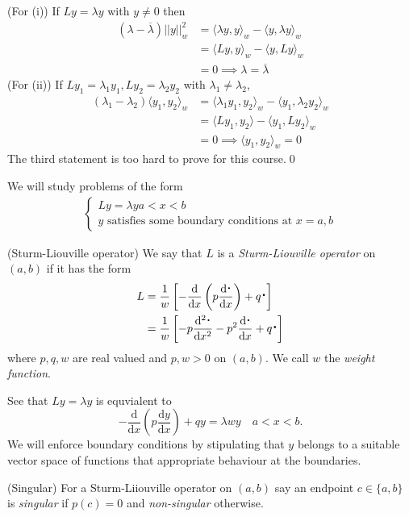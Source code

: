 \documentclass{article}
\begin{document}
	 \pf (For (i)) If $ Ly=\lambda y $ with $ y\ne 0 $ then
	 \begin{align*}
		 (\lambda-\overline\lambda)||y||_w^2&=\langle \lambda y,y\rangle_w-\langle y,\lambda y\rangle_w \\
						    &= \langle Ly, y\rangle_w - \langle y,Ly\rangle_w \\
						    &= 0 \implies \lambda = \overline \lambda
	 \end{align*}
	 (For (ii)) If $ Ly_1=\lambda_1y_1, Ly_2=\lambda_2y_2 $ with $ \lambda_1\ne \lambda_2 $,
	 \begin{align*}
		 (\lambda_1-\lambda_2)\langle y_1,y_2\rangle_w &= \langle \lambda_1y_1,y_2\rangle_w-\langle y_1,\lambda_2y_2\rangle _w\\
							       &= \langle Ly_1,y_2\rangle - \langle y_1,Ly_2\rangle_w \\
							       &= 0 \implies \langle y_1,y_2\rangle_w=0
	 \end{align*}
	 The third statement is too hard to prove for this course.\qed
\par
We will study problems of the form
\begin{align}
  \begin{cases}
	  Ly=\lambda y a<x<b \\
	  y \text{ satisfies some boundary conditions at } x=a,b
  \end{cases}
\end{align}
\begin{definition}
	(Sturm-Liouville operator) We say that $ L $ is a \textit{Sturm-Liouville operator} on $ (a,b) $ if it has the form
	\begin{align*}
		L&=\frac 1w\left[-\frac{\mathrm d}{\mathrm d x}\left(p\frac{\mathrm d \mathhuge\cdot}{\mathrm dx}\right)+q\mathhuge\cdot\right]\\
		 &= \frac 1w\left[-p\frac{\mathrm d^2\mathhuge \cdot}{\mathrm dx^2}-p^2\frac{\mathrm d \mathhuge \cdot}{\mathrm dx}+q\mathhuge\cdot\right]
		\end{align*}
		where $ p,q,w $ are real valued and $ p,w>0 $ on $ (a,b) $. We call $ w $ the \textit{weight function}.
\end{definition}
See that $ Ly=\lambda y $ is equvialent to
\[
	-\frac{\mathrm d}{\mathrm dx}\left(p\frac{\mathrm dy}{\mathrm dx}\right)+qy=\lambda wy\quad a<x<b.
\]
We will enforce boundary conditions by stipulating that $ y $ belongs to a suitable vector space of functions that appropriate behaviour at the boundaries.
\begin{definition}
	(Singular) For a Sturm-Liiouville operator on $ (a,b) $ say an endpoint $ c\in \{a,b\} $ is \textit{singular} if $ p(c)=0 $ and \textit{non-singular} otherwise. 
\end{definition}
\end{document}
